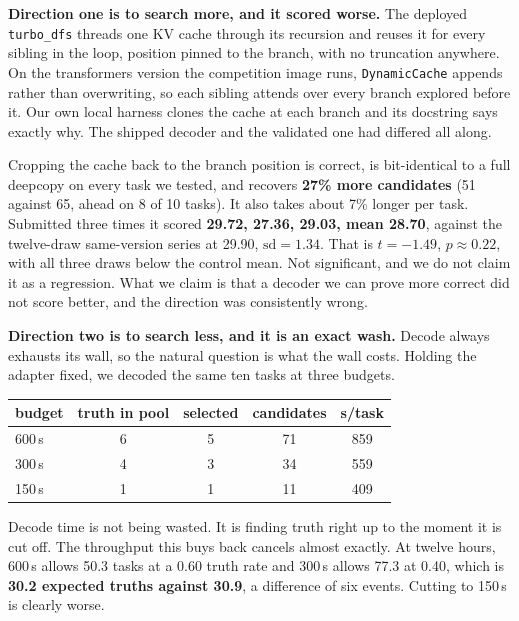\documentclass[11pt]{article}
\begin{document}
\textbf{Direction one is to search more, and it scored worse.} The deployed \texttt{turbo\_dfs} threads one KV
cache through its recursion and reuses it for every sibling in the loop, position pinned to the
branch, with no truncation anywhere. On the transformers version the competition image runs,
\texttt{DynamicCache} appends rather than overwriting, so each sibling attends over every branch
explored before it. Our own local harness clones the cache at each branch and its docstring says
exactly why. The shipped decoder and the validated one had differed all along.

Cropping the cache back to the branch position is correct, is bit-identical to a full deepcopy on
every task we tested, and recovers \textbf{27\% more candidates} (51 against 65, ahead on 8 of 10
tasks). It also takes about 7\% longer per task. Submitted three times it scored \textbf{29.72,
27.36, 29.03, mean 28.70}, against the twelve-draw same-version series at 29.90, $\text{sd}=1.34$.
That is $t=-1.49$, $p\approx0.22$, with all three draws below the control mean. Not significant, and we do
not claim it as a regression. What we claim is that a decoder we can prove more correct did not
score better, and the direction was consistently wrong.

\textbf{Direction two is to search less, and it is an exact wash.} Decode always exhausts its wall, so the
natural question is what the wall costs. Holding the adapter fixed, we decoded the same ten tasks at
three budgets.

\begin{center}
\begin{tabular}{lcccc}
\toprule
budget & truth in pool & selected & candidates & s/task \\
\midrule
600\,s & 6 & 5 & 71 & 859 \\
300\,s & 4 & 3 & 34 & 559 \\
150\,s & 1 & 1 & 11 & 409 \\
\bottomrule
\end{tabular}
\end{center}

Decode time is not being wasted. It is finding truth right up to the moment it is cut off. The
throughput this buys back cancels almost exactly. At twelve hours, 600\,s allows 50.3 tasks at a 0.60
truth rate and 300\,s allows 77.3 at 0.40, which is \textbf{30.2 expected truths against 30.9}, a
difference of six events. Cutting to 150\,s is clearly worse.
\end{document}
